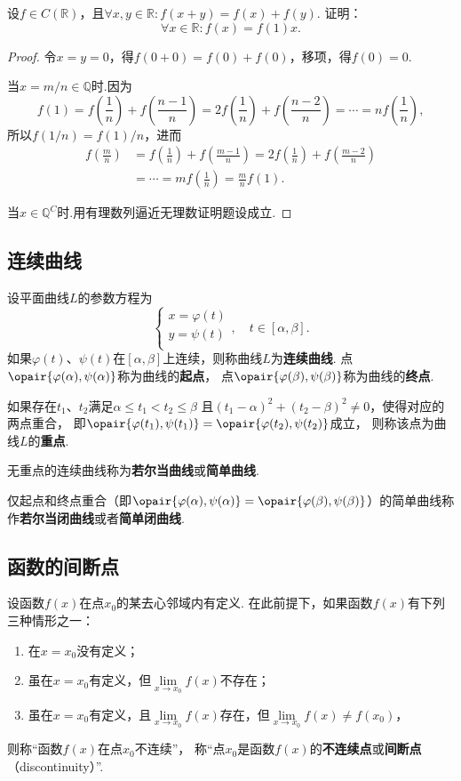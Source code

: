 \begin{example}
设\(f \in C(\mathbb{R})\)，且\(\forall x,y\in\mathbb{R} : f(x+y) = f(x) + f(y)\).
证明：\[
\forall x\in\mathbb{R} : f(x) = f(1) x.
\]
\begin{proof}
\def\f#1#2{f\left(\frac{#1}{#2}\right)}
令\(x=y=0\)，得\(f(0+0) = f(0) + f(0)\)，移项，得\(f(0) = 0\).

当\(x = m/n \in \mathbb{Q}\)时.因为\[
f(1) = \f{1}{n} + \f{n-1}{n}
= 2 \f{1}{n} + \f{n-2}{n}
= \dotsb
= n \f{1}{n},
\]所以\(f(1/n) = f(1) / n\)，进而\[
\begin{split}
\f{m}{n}
&= \f{1}{n} + \f{m-1}{n}
= 2 \f{1}{n} + \f{m-2}{n} \\
&= \dotsb
= m \f{1}{n} = \frac{m}{n} f(1).
\end{split}
\]

当\(x \in \mathbb{Q}^C\)时.用有理数列逼近无理数证明题设成立.
\end{proof}
\end{example}

\subsection{连续曲线}
\begin{definition}
设平面曲线\(L\)的参数方程为\[
\left\{ \begin{array}{l}
x = \varphi(t) \\
y = \psi(t) \\
\end{array} \right.,
\quad
t \in [\alpha,\beta].
\]如果\(\varphi(t)\)、\(\psi(t)\)在\([\alpha,\beta]\)上连续，则称曲线\(L\)为\textbf{连续曲线}.
点\(\opair{\varphi(\alpha),\psi(\alpha)}\)称为曲线的\textbf{起点}，%
点\(\opair{\varphi(\beta),\psi(\beta)}\)称为曲线的\textbf{终点}.

如果存在\(t_1\)、\(t_2\)满足\(\alpha \leqslant t_1 < t_2 \leqslant \beta\)
且\((t_1-\alpha)^2+(t_2-\beta)^2 \neq 0\)，使得对应的两点重合，%
即\(\opair{\varphi(t_1),\psi(t_1)}=\opair{\varphi(t_2),\psi(t_2)}\)成立，%
则称该点为曲线\(L\)的\textbf{重点}.

无重点的连续曲线称为\textbf{若尔当曲线}或\textbf{简单曲线}.

仅起点和终点重合（即\(\opair{\varphi(\alpha),\psi(\alpha)}=\opair{\varphi(\beta),\psi(\beta)}\)）的简单曲线称作\textbf{若尔当闭曲线}或者\textbf{简单闭曲线}.
\end{definition}

\subsection{函数的间断点}
设函数\(f(x)\)在点\(x_0\)的某去心邻域内有定义.
在此前提下，如果函数\(f(x)\)有下列三种情形之一：
\begin{enumerate}
\item 在\(x=x_0\)没有定义；
\item 虽在\(x=x_0\)有定义，但\(\lim\limits_{x \to x_0} f(x)\)不存在；
\item 虽在\(x=x_0\)有定义，且\(\lim\limits_{x \to x_0} f(x)\)存在，但\(\lim\limits_{x \to x_0} f(x) \neq f(x_0)\)，%
\end{enumerate}
则称“函数\(f(x)\)在点\(x_0\)不连续”，%
称“点\(x_0\)是函数\(f(x)\)的\textbf{不连续点}或\textbf{间断点}（discontinuity）”.

